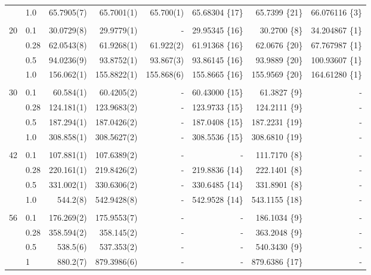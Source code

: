 \begin{table}
\begin{center}
\begin{tabular}{rl|rrrrrr}
          &   1.0    & 65.7905(7)  & 65.7001(1)   & 65.700(1) &65.68304 \{17\}	& 65.7399 \{21\} & 66.076116 \{3\}\\
\cline{2-8}
\multicolumn{8}{c}{} \\
    20    &   0.1    &  30.0729(8)  &  29.9779(1) & -		&29.95345 \{16\}	& 30.2700 \{8\} & 34.204867 \{1\}\\
          &   0.28   &  62.0543(8)  &  61.9268(1) & 61.922(2) &61.91368 \{16\}	& 62.0676 \{20\} & 67.767987 \{1\}\\
          &   0.5    &  94.0236(9)  &  93.8752(1) & 93.867(3) &93.86145 \{16\}	& 93.9889 \{20\} & 100.93607 \{1\}\\
          &   1.0    & 156.062(1)   & 155.8822(1) & 155.868(6)&155.8665 \{16\}	& 155.9569 \{20\}& 164.61280 \{1\}\\
\cline{2-8}
\multicolumn{8}{c}{} \\
    30    &   0.1    &  60.584(1)  &  60.4205(2)  & -		&60.43000 \{15\}	&  61.3827 \{9\}& -\\
          &   0.28   & 124.181(1)  & 123.9683(2)  & - 		&123.9733 \{15\}	& 124.2111 \{9\}& -\\
          &   0.5    & 187.294(1)  & 187.0426(2)  & - 		&187.0408 \{15\}	& 187.2231 \{19\}& -\\
          &   1.0    & 308.858(1)  & 308.5627(2)  & -	 	&308.5536 \{15\}	& 308.6810 \{19\}& -\\
\cline{2-8}
\multicolumn{8}{c}{} \\
    42    &   0.1    & 107.881(1)  & 107.6389(2)  & - 		&- 			& 111.7170 \{8\}& -\\
          &   0.28   & 220.161(1)  & 219.8426(2)  & - 		&219.8836 \{14\}	& 222.1401 \{8\}& -\\
          &   0.5    & 331.002(1)  & 330.6306(2)  & - 		&330.6485 \{14\}	& 331.8901 \{8\}& -\\
          &   1.0    & 544.2(8)    & 542.9428(8)  & - 		&542.9528 \{14\}	& 543.1155 \{18\}& -\\
\cline{2-8}
\multicolumn{8}{c}{} \\
    56    &   0.1    & 176.269(2) & 175.9553(7)   & -		& -		& 186.1034 \{9\} & -		\\
          &   0.28   & 358.594(2) & 358.145(2)    & -		& -		& 363.2048 \{9\} & -		\\
          &   0.5    & 538.5(6)   & 537.353(2)    & -		& -		& 540.3430 \{9\} & -		\\
          &   1      & 880.2(7)   & 879.3986(6)   & -		& -		& 879.6386 \{17\}& -		\\
\hline\hline



\end{tabular}
\end{center}
\end{table}
